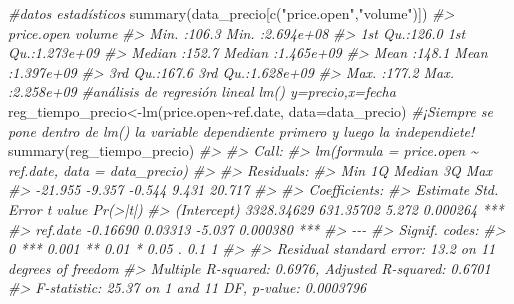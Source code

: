 \documentclass[
]{book}
\newenvironment{Shaded}{\begin{snugshade}}{\end{snugshade}}
\newcommand{\AttributeTok}[1]{\textcolor[rgb]{0.77,0.63,0.00}{#1}}
\newcommand{\CommentTok}[1]{\textcolor[rgb]{0.56,0.35,0.01}{\textit{#1}}}
\newcommand{\FunctionTok}[1]{\textcolor[rgb]{0.00,0.00,0.00}{#1}}
\newcommand{\NormalTok}[1]{#1}
\newcommand{\OtherTok}[1]{\textcolor[rgb]{0.56,0.35,0.01}{#1}}
\newcommand{\SpecialCharTok}[1]{\textcolor[rgb]{0.00,0.00,0.00}{#1}}
\newcommand{\StringTok}[1]{\textcolor[rgb]{0.31,0.60,0.02}{#1}}
\begin{document}
\begin{Shaded}
\begin{Highlighting}[]
\CommentTok{\#datos estadísticos}
\FunctionTok{summary}\NormalTok{(data\_precio[}\FunctionTok{c}\NormalTok{(}\StringTok{"price.open"}\NormalTok{,}\StringTok{"volume"}\NormalTok{)])}
\CommentTok{\#\textgreater{}    price.open        volume         }
\CommentTok{\#\textgreater{}  Min.   :106.3   Min.   :2.694e+08  }
\CommentTok{\#\textgreater{}  1st Qu.:126.0   1st Qu.:1.273e+09  }
\CommentTok{\#\textgreater{}  Median :152.7   Median :1.465e+09  }
\CommentTok{\#\textgreater{}  Mean   :148.1   Mean   :1.397e+09  }
\CommentTok{\#\textgreater{}  3rd Qu.:167.6   3rd Qu.:1.628e+09  }
\CommentTok{\#\textgreater{}  Max.   :177.2   Max.   :2.258e+09}
\CommentTok{\#análisis de regresión lineal lm() y=precio,x=fecha}
\NormalTok{reg\_tiempo\_precio}\OtherTok{\textless{}{-}}\FunctionTok{lm}\NormalTok{(price.open}\SpecialCharTok{\textasciitilde{}}\NormalTok{ref.date, }\AttributeTok{data=}\NormalTok{data\_precio) }
\CommentTok{\#¡Siempre se pone dentro de lm() la variable dependiente primero y luego la independiete!}
\FunctionTok{summary}\NormalTok{(reg\_tiempo\_precio)}
\CommentTok{\#\textgreater{} }
\CommentTok{\#\textgreater{} Call:}
\CommentTok{\#\textgreater{} lm(formula = price.open \textasciitilde{} ref.date, data = data\_precio)}
\CommentTok{\#\textgreater{} }
\CommentTok{\#\textgreater{} Residuals:}
\CommentTok{\#\textgreater{}     Min      1Q  Median      3Q     Max }
\CommentTok{\#\textgreater{} {-}21.955  {-}9.357  {-}0.544   9.431  20.717 }
\CommentTok{\#\textgreater{} }
\CommentTok{\#\textgreater{} Coefficients:}
\CommentTok{\#\textgreater{}               Estimate Std. Error t value Pr(\textgreater{}|t|)    }
\CommentTok{\#\textgreater{} (Intercept) 3328.34629  631.35702   5.272 0.000264 ***}
\CommentTok{\#\textgreater{} ref.date      {-}0.16690    0.03313  {-}5.037 0.000380 ***}
\CommentTok{\#\textgreater{} {-}{-}{-}}
\CommentTok{\#\textgreater{} Signif. codes:  }
\CommentTok{\#\textgreater{} 0 \textquotesingle{}***\textquotesingle{} 0.001 \textquotesingle{}**\textquotesingle{} 0.01 \textquotesingle{}*\textquotesingle{} 0.05 \textquotesingle{}.\textquotesingle{} 0.1 \textquotesingle{} \textquotesingle{} 1}
\CommentTok{\#\textgreater{} }
\CommentTok{\#\textgreater{} Residual standard error: 13.2 on 11 degrees of freedom}
\CommentTok{\#\textgreater{} Multiple R{-}squared:  0.6976, Adjusted R{-}squared:  0.6701 }
\CommentTok{\#\textgreater{} F{-}statistic: 25.37 on 1 and 11 DF,  p{-}value: 0.0003796}


\end{Highlighting}
\end{Shaded}
\end{document}
